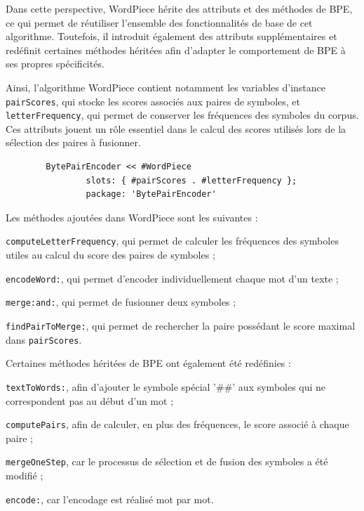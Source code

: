 \documentclass[12pt,a4paper]{report}
\begin{document}
		Dans cette perspective, WordPiece hérite des attributs et des méthodes de BPE, ce qui permet de réutiliser l’ensemble des fonctionnalités de base de cet algorithme. Toutefois, il introduit également des attributs supplémentaires et redéfinit certaines méthodes héritées afin d’adapter le comportement de BPE à ses propres spécificités.
		
		Ainsi, l’algorithme WordPiece contient notamment les variables d’instance \texttt{pairScores}, qui stocke les scores associés aux paires de symboles, et \texttt{letterFrequency}, qui permet de conserver les fréquences des symboles du corpus. Ces attributs jouent un rôle essentiel dans le calcul des scores utilisés lors de la sélection des paires à fusionner.
		
	
	\begin{verbatim}
		BytePairEncoder << #WordPiece	
				slots: { #pairScores . #letterFrequency };	
				package: 'BytePairEncoder'
	\end{verbatim}
	
	Les méthodes ajoutées dans WordPiece sont les suivantes :
	
	\begin{itemizeFB}
		
		\item \texttt{computeLetterFrequency}, qui permet de calculer les fréquences des symboles utiles au calcul du score des paires de symboles ;
		
		\item \texttt{encodeWord:}, qui permet d’encoder individuellement chaque mot d’un texte ;
		
		\item \texttt{merge:and:}, qui permet de fusionner deux symboles ;
		
		\item \texttt{findPairToMerge:}, qui permet de rechercher la paire possédant le score maximal dans \texttt{pairScores}.
		
	\end{itemizeFB}
	
	Certaines méthodes héritées de BPE ont également été redéfinies :
	\begin{itemizeFB}
		
		\item \texttt{textToWords:}, afin d’ajouter le symbole spécial '\#\#' aux symboles qui ne correspondent pas au début d’un mot ;
		
		\item \texttt{computePairs}, afin de calculer, en plus des fréquences, le score associé à chaque paire ;
		
		\item \texttt{mergeOneStep}, car le processus de sélection et de fusion des symboles a été modifié ;
		
		\item \texttt{encode:}, car l’encodage est réalisé mot par mot.
		
	\end{itemizeFB}
	
\end{document}

